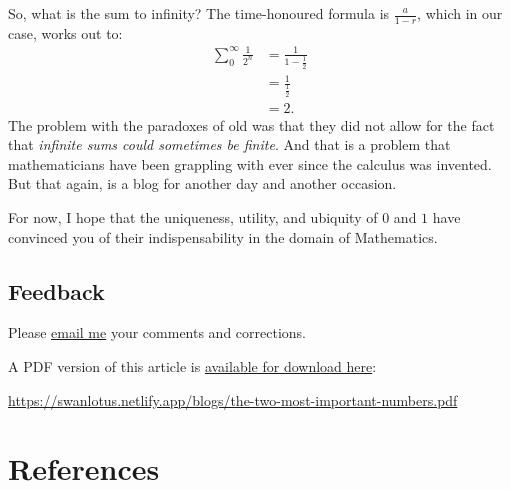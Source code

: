 \documentclass[
  a4paper,
]{article}
\begin{document}
So, what is the sum to infinity? The time-honoured formula is
\(\frac{a}{1-r}\), which in our case, works out to: \[
\begin{aligned}
\sum_{0}^{\infty} \frac{1}{2^n} &= \frac{1}{1-\frac{1}{2}}\\
&= \frac{1}{\frac{1}{2}}\\
&= 2.
\end{aligned}
\] The problem with the paradoxes of old was that they did not allow for
the fact that \emph{infinite sums could sometimes be finite}. And that
is a problem that mathematicians have been grappling with ever since the
calculus was invented. But that again, is a blog for another day and
another occasion.

For now, I hope that the uniqueness, utility, and ubiquity of \(0\) and
\(1\) have convinced you of their indispensability in the domain of
Mathematics.

\hypertarget{feedback}{%
\subsection{Feedback}\label{feedback}}

Please \href{mailto:feedback.swanlotus@gmail.com}{email me} your
comments and corrections.

\noindent A PDF version of this article is
\href{./the-two-most-important-numbers.pdf}{available for download
here}:

\begin{small}

\begin{sffamily}

\url{https://swanlotus.netlify.app/blogs/the-two-most-important-numbers.pdf}

\end{sffamily}

\end{small}

\hypertarget{bibliography}{%
\section*{References}\label{bibliography}}
\end{document}
